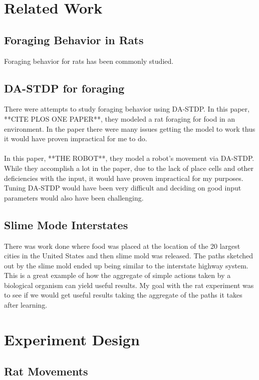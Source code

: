 \documentclass[conference]{IEEEtran}
\begin{document}
\section{Related Work}

\subsection{Foraging Behavior in Rats}
Foraging behavior for rats has been commonly studied.

\subsection{DA-STDP for foraging}

There were attempts to study foraging behavior using DA-STDP. In this paper, **CITE PLOS ONE PAPER**, they modeled a rat foraging for food in an environment. In the paper there were many issues getting the model to work thus it would have proven impractical for me to do. \\
\\
In this paper, **THE ROBOT**, they model a robot's movement via DA-STDP. While they accomplish a lot in the paper, due to the lack of place cells and other deficiencies with the input, it would have proven impractical for my purposes. Tuning DA-STDP would have been very difficult and deciding on good input parameters would also have been challenging. \\

\subsection{Slime Mode Interstates}

There was work done where food was placed at the location of the 20 largest cities in the United States and then slime mold was released. The paths sketched out by the slime mold ended up being similar to the interstate highway system. This is a great example of how the aggregate of simple actions taken by a biological organism can yield useful results. My goal with the rat experiment was to see if we would get useful results taking the aggregate of the paths it takes after learning. 


\section{Experiment Design}

\subsection{Rat Movements}
\end{document}
